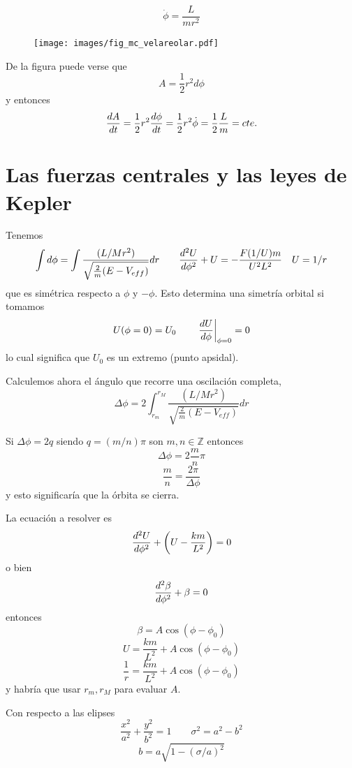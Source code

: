 \documentclass[10pt,oneside]{CBFT_book}
\begin{document}
\[
	\dot{\phi} = \frac{L}{m r^2}
\]
\begin{figure}[hbt]
	\begin{center}
	\texttt{[image: images/fig\_mc\_velareolar.pdf]}	 
	\end{center}
	\caption{}
\end{figure} 
De la figura puede verse que 
\[
	A = \frac{1}{2} r^2 d\phi 
\]
y  entonces
\[
	\dtot{A}{t} = \frac{1}{2} r^2 \dtot{\phi}{t} = \frac{1}{2} r^2 \dot{\phi} = \frac{1}{2}\frac{L}{m} = cte.
\]

\section{Las fuerzas centrales y las leyes de Kepler}

Tenemos 
\[
	\int d\phi = \int \frac{(L/Mr^2)}{\sqrt{ \frac{2}{m}(E - V_{eff})}} dr	\qquad
	\dtot[2]{U}{\phi} + U  = - \frac{F(1/U) m}{U^2 L^2} \quad U = 1/r
\]
que es simétrica respecto a $\phi$ y $-\phi$. Esto determina una simetría orbital si
tomamos
\[
	U(\phi=0) = U_0 	\qquad		\left. \dtot{U}{\phi} \right|_{\phi=0}= 0
\]
lo cual significa que $U_0$ es un extremo (punto apsidal).

Calculemos ahora el ángulo que recorre una oscilación completa,
\[
	\Delta \phi = 2\int_{r_m}^{r_M} \frac{(L/Mr^2)}{\sqrt{ \frac{2}{m}(E - V_{eff})}} dr
\]

Si $\Delta \phi = 2 q $ siendo $q= (m/n)\pi $ son $m,n \in \mathbb{Z}$ entonces
\[
	\Delta \phi = 2 \frac{m}{n} \pi 
\]
\[
	\frac{m}{n} = \frac{2\pi}{\Delta \phi}
\]
y esto significaría que la órbita se cierra.

La ecuación a resolver es 
\[
	\dtot[2]{U}{\phi} + \left( U  - \frac{k m}{L^2} \right) = 0
\]
o bien 
\[
	\dtot[2]{\beta}{\phi} + \beta = 0
\]
entonces
\[
	\beta = A \cos( \phi -\phi_0 )
\]
\[
	U = \frac{km}{L^2} +  A \cos( \phi -\phi_0 )
\]
\[
	\frac{1}{r} = \frac{km}{L^2} +  A \cos( \phi -\phi_0 )
\]
y habría que usar $r_m, r_M$ para evaluar $A$.


Con respecto a las elipses
\[
	\frac{x^2}{a^2} + \frac{y^2}{b^2} = 1	\qquad \sigma^2 = a^2 - b^2
\]
\[
	b = a \sqrt{ 1 - (\sigma/a)^2 }
\]
\end{document}
